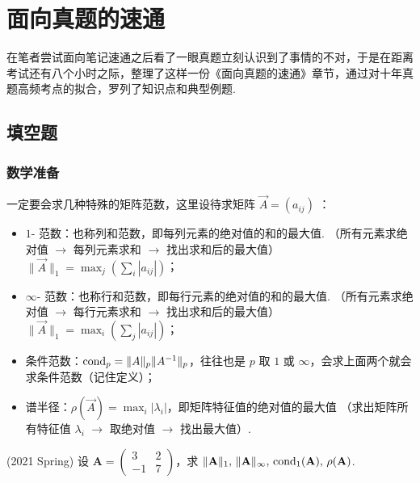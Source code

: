 \chapter*{面向真题的速通}
{\kaishu \color{blue} 在笔者尝试面向笔记速通之后看了一眼真题立刻认识到了事情的不对，于是在距离考试还有八个小时之际，整理了这样一份《面向真题的速通》章节，通过对十年真题高频考点的拟合，罗列了知识点和典型例题.}

\section*{填空题}
\subsection*{数学准备}
一定要会求几种特殊的矩阵范数，这里设待求矩阵 $\vec{A} = (a_{ij})$ ：
\begin{itemize}
    \item $1$- 范数：也称列和范数，即每列元素的绝对值的和的最大值. {\color{red} （所有元素求绝对值 $\to$ 每列元素求和 $\to$ 找出求和后的最大值）} $\|\vec{A}\|_1 =\max_j \left(\sum_i |a_{ij}|\right)$；
    \item $\infty $- 范数：也称行和范数，即每行元素的绝对值的和的最大值. {\color{red}（所有元素求绝对值 $\to$ 每行元素求和 $\to$ 找出求和后的最大值）} $\|\vec{A}\|_1 =\max_i \left(\sum_j |a_{ij}|\right)$；
    \item 条件范数：$\operatorname{cond}_p = \|A\|_p \|A^{-1}\|_p$，往往也是 $p$ 取 $1$ 或 $\infty$，会求上面两个就会求条件范数（记住定义）；
    \item 谱半径：$\rho(\vec{A}) = \max_i |\lambda_i|$，即矩阵特征值的绝对值的最大值{\color{red} （求出矩阵所有特征值 $\lambda_i$ $\to$ 取绝对值 $\to$ 找出最大值）}.
\end{itemize}
\begin{problembox}
    \begin{example}
        (2021 Spring) 设 $\mathbf{A} = \begin{pmatrix}
            3 & 2 \\ -1 & 7
        \end{pmatrix}$，求 $\|\mathbf{A}\|_1,\, \|\mathbf{A}\|_\infty,\, \operatorname{cond}_1 (\mathbf{A}),\, \rho(\mathbf{A})$.
    \end{example}
    \begin{solution}
        
    \end{solution}
\end{problembox}

